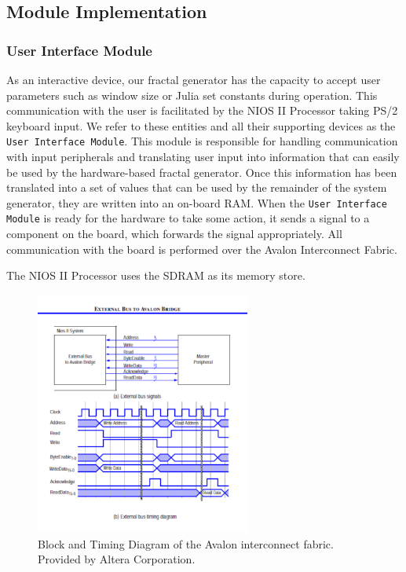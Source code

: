 \documentclass{article}
\begin{document}
\subsection{Module Implementation}

\subsubsection{User Interface Module}

As an interactive device, our fractal generator has the capacity to accept user parameters such as window size or
Julia set constants during operation. This communication with the user is facilitated by the NIOS II Processor 
taking PS/2 keyboard input. We refer to these entities and all their supporting devices as the \texttt{User Interface 
Module}. This module is responsible for handling communication with input peripherals
and translating user input into information that can easily be used by the hardware-based fractal generator. Once 
this information has been translated into a set of values that can be used by the remainder of the system generator, they are written into an on-board RAM. When the \texttt{User Interface Module} is ready for the hardware to take some action, it sends a signal to a component on the board, which forwards the signal appropriately. All communication with
the board is performed over the Avalon Interconnect Fabric.

The NIOS II Processor uses the SDRAM as its memory store.

\begin{figure}
  \centering
    \includegraphics[width=200pt]{block_diagrams/nbat.pdf}
  \caption{Block and Timing Diagram of the Avalon interconnect fabric. Provided by Altera Corporation.}
\end{figure}
\end{document}
